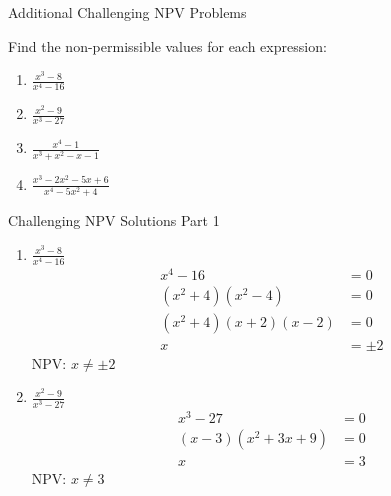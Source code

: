 \documentclass[aspectratio=169]{beamer}
\begin{document}
\begin{frame}{Additional Challenging NPV Problems}
\begin{tcolorbox}[colback=lightgray,colframe=primary,title=Advanced Practice]
\footnotesize
Find the non-permissible values for each expression:
\begin{enumerate}
  \item $\frac{x^3 - 8}{x^4 - 16}$
  \item $\frac{x^2 - 9}{x^3 - 27}$
  \item $\frac{x^4 - 1}{x^3 + x^2 - x - 1}$
  \item $\frac{x^3 - 2x^2 - 5x + 6}{x^4 - 5x^2 + 4}$
\end{enumerate}
\end{tcolorbox}
\end{frame}

\begin{frame}{Challenging NPV Solutions Part 1}
\begin{tcolorbox}[colback=lightgray,colframe=accent,title=Detailed Solutions]
\footnotesize
\begin{enumerate}
  \item $\frac{x^3 - 8}{x^4 - 16}$
  \begin{align*}
    x^4 - 16 &= 0 \\
    (x^2+4)(x^2-4) &= 0 \\
    (x^2+4)(x+2)(x-2) &= 0 \\
    x &= \pm 2
  \end{align*}
  NPV: $x \neq \pm 2$

  \item $\frac{x^2 - 9}{x^3 - 27}$
  \begin{align*}
    x^3 - 27 &= 0 \\
    (x-3)(x^2+3x+9) &= 0 \\
    x &= 3
  \end{align*}
  NPV: $x \neq 3$
\end{enumerate}
\end{tcolorbox}
\end{frame}
\end{document}
